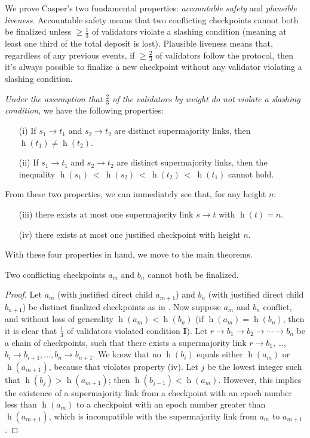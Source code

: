 \documentclass[12pt]{article}
\newcommand{\h}{\operatorname{h}\xspace}
\begin{document}
We prove Casper's two fundamental properties: \textit{accountable safety} and \textit{plausible liveness}. Accountable safety means that two conflicting checkpoints cannot both be finalized unless $\geq \frac{1}{3}$ of validators violate a slashing condition (meaning at least one third of the total deposit is lost).  Plausible liveness means that, regardless of any previous events, if $\geq \frac{2}{3}$ of validators follow the protocol, then it's always possible to finalize a new checkpoint without any validator violating a slashing condition.

\emph{Under the assumption that $\frac{2}{3}$ of the validators by weight do not violate a slashing condition}, we have the following properties:

\begin{enumerate}
    \item[(i)] If $s_1 \rightarrow t_1$ and $s_2 \rightarrow t_2$ are distinct supermajority links, then $\h(t_1) \not= \h(t_2)$.
    \item[(ii)] If $s_1 \rightarrow t_1$ and $s_2 \rightarrow t_2$ are distinct supermajority links, then the inequality $\h(s_1)~<~\h(s_2)~<~\h(t_2)~<~\h(t_1)$ cannot hold.
\end{enumerate}

From these two properties, we can immediately see that, for any height $n$: 
\begin{enumerate}
\item[(iii)] there exists at most one supermajority link $s \to t$ with $\h(t) = n$.
\item[(iv)] there exists at most one justified checkpoint with height $n$.  
\end{enumerate}

With these four properties in hand, we move to the main theorems.

\begin{theorem}
\label{theorem:safety}
Two conflicting checkpoints $a_m$ and $b_n$ cannot both be finalized.
\begin{proof}
Let $a_m$ (with justified direct child $a_{m+1}$) and $b_n$ (with justified direct child $b_{n+1}$) be distinct finalized checkpoints as in . Now suppose $a_m$ and $b_n$ conflict, and without loss of generality $\h(a_m) < \h(b_n)$ (if $\h(a_m) = \h(b_n)$, then it is clear that $\frac{1}{3}$ of validators violated condition \textbf{I}). Let $r \rightarrow b_1 \rightarrow b_2 \rightarrow \cdots \rightarrow b_n$ be a chain of checkpoints, such that there exists a supermajority link $r \to b_1$, \ldots, $b_i \to b_{i+1}, \ldots, b_{n} \to b_{n+1}$. We know that no $\h(b_i)$ equals either $\h(a_m)$ or $\h(a_{m+1})$, because that violates property (iv). Let $j$ be the lowest integer such that $\h(b_j) > \h(a_{m+1})$; then $\h(b_{j-1}) < \h(a_m)$. However, this implies the existence of a supermajority link from a checkpoint with an epoch number less than $\h(a_m)$ to a checkpoint with an epoch number greater than $\h(a_{m+1})$, which is incompatible with the supermajority link from $a_m$ to $a_{m+1}$.
\end{proof}
\end{theorem}
\end{document}
